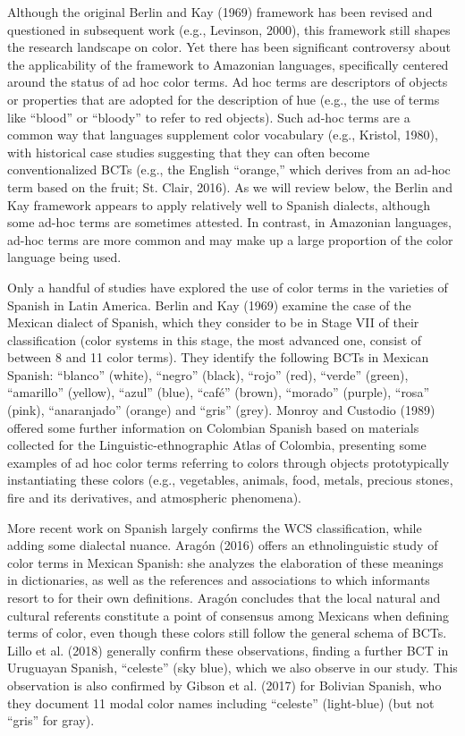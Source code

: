 \documentclass[
  english,
  ,man,floatsintext]{apa6}
\begin{document}
Although the original Berlin and Kay (1969) framework has been revised and questioned in subsequent work (e.g., Levinson, 2000), this framework still shapes the research landscape on color. Yet there has been significant controversy about the applicability of the framework to Amazonian languages, specifically centered around the status of ad hoc color terms. Ad hoc terms are descriptors of objects or properties that are adopted for the description of hue (e.g., the use of terms like \enquote{blood} or \enquote{bloody} to refer to red objects). Such ad-hoc terms are a common way that languages supplement color vocabulary (e.g., Kristol, 1980), with historical case studies suggesting that they can often become conventionalized BCTs (e.g., the English ``orange,'' which derives from an ad-hoc term based on the fruit; St. Clair, 2016). As we will review below, the Berlin and Kay framework appears to apply relatively well to Spanish dialects, although some ad-hoc terms are sometimes attested. In contrast, in Amazonian languages, ad-hoc terms are more common and may make up a large proportion of the color language being used.

Only a handful of studies have explored the use of color terms in the varieties of Spanish in Latin America. Berlin and Kay (1969) examine the case of the Mexican dialect of Spanish, which they consider to be in Stage VII of their classification (color systems in this stage, the most advanced one, consist of between 8 and 11 color terms). They identify the following BCTs in Mexican Spanish: \enquote{blanco} (white), \enquote{negro} (black), \enquote{rojo} (red), \enquote{verde} (green), \enquote{amarillo} (yellow), \enquote{azul} (blue), \enquote{café} (brown), \enquote{morado} (purple), \enquote{rosa} (pink), \enquote{anaranjado} (orange) and \enquote{gris} (grey). Monroy and Custodio (1989) offered some further information on Colombian Spanish based on materials collected for the Linguistic-ethnographic Atlas of Colombia, presenting some examples of ad hoc color terms referring to colors through objects prototypically instantiating these colors (e.g., vegetables, animals, food, metals, precious stones, fire and its derivatives, and atmospheric phenomena).

More recent work on Spanish largely confirms the WCS classification, while adding some dialectal nuance. Aragón (2016) offers an ethnolinguistic study of color terms in Mexican Spanish: she analyzes the elaboration of these meanings in dictionaries, as well as the references and associations to which informants resort to for their own definitions. Aragón concludes that the local natural and cultural referents constitute a point of consensus among Mexicans when defining terms of color, even though these colors still follow the general schema of BCTs. Lillo et al. (2018) generally confirm these observations, finding a further BCT in Uruguayan Spanish, \enquote{celeste} (sky blue), which we also observe in our study. This observation is also confirmed by Gibson et al. (2017) for Bolivian Spanish, who they document 11 modal color names including \enquote{celeste} (light-blue) (but not \enquote{gris} for gray).
\end{document}
